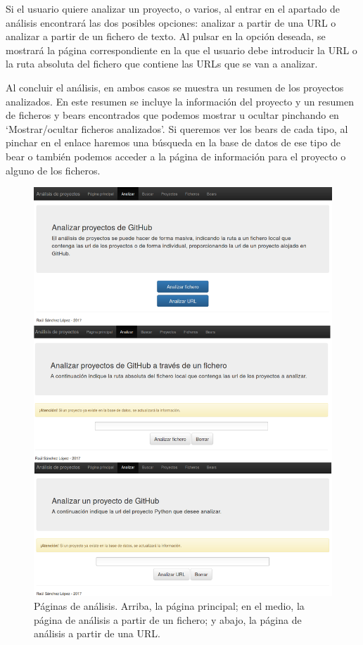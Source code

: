 \documentclass[a4paper, 12pt]{book}
\begin{document}
Si el usuario quiere analizar un proyecto, o varios, al entrar en el apartado de análisis encontrará las dos posibles opciones: analizar a partir de una URL o analizar a partir de un fichero de texto. Al pulsar en la opción deseada, se mostrará la página correspondiente en la que el usuario debe introducir la URL o la ruta absoluta del fichero que contiene las URLs que se van a analizar.

Al concluir el análisis, en ambos casos se muestra un resumen de los proyectos analizados. En este resumen se incluye la información del proyecto y un resumen de ficheros y bears encontrados que podemos mostrar u ocultar pinchando en `Mostrar/ocultar ficheros analizados'. Si queremos ver los bears de cada tipo, al pinchar en el enlace haremos una búsqueda en la base de datos de ese tipo de bear o también podemos acceder a la página de información para el proyecto o alguno de los ficheros.

\begin{figure}[H]
  \centering
  \includegraphics[width=15cm, keepaspectratio]{img/webAnalisis}
  \caption{Páginas de análisis. Arriba, la página principal; en el medio, la página de análisis a partir de un fichero; y abajo, la página de análisis a partir de una URL.}
  \label{fig:webAnalisis}
\end{figure}
\end{document}
